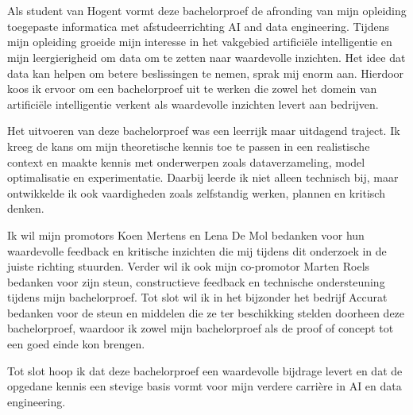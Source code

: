 
\chapter*{}%
\label{ch:voorwoord}


Als student van Hogent vormt deze bachelorproef de afronding van mijn opleiding toegepaste informatica met afstudeerrichting AI and data engineering. Tijdens mijn opleiding groeide mijn interesse in het vakgebied artificiële intelligentie en mijn leergierigheid om data om te zetten naar waardevolle inzichten. Het idee dat data kan helpen om betere beslissingen te nemen, sprak mij enorm aan. Hierdoor koos ik ervoor om een bachelorproef uit te werken die zowel het domein van artificiële intelligentie verkent als waardevolle inzichten levert aan bedrijven.

Het uitvoeren van deze bachelorproef was een leerrijk maar uitdagend traject. Ik kreeg de kans om mijn theoretische kennis toe te passen in een realistische context en maakte kennis met onderwerpen zoals dataverzameling, model optimalisatie en experimentatie. Daarbij leerde ik niet alleen technisch bij, maar ontwikkelde ik ook vaardigheden zoals zelfstandig werken, plannen en kritisch denken.

Ik wil mijn promotors Koen Mertens en Lena De Mol bedanken voor hun waardevolle feedback en kritische inzichten die mij tijdens dit onderzoek in de juiste richting stuurden. Verder wil ik ook mijn co-promotor Marten Roels bedanken voor zijn steun, constructieve feedback en technische ondersteuning tijdens mijn bachelorproef. Tot slot wil ik in het bijzonder het bedrijf Accurat bedanken voor de steun en middelen die ze ter beschikking stelden doorheen deze bachelorproef, waardoor ik zowel mijn bachelorproef als de proof of concept tot een goed einde kon brengen.

Tot slot hoop ik dat deze bachelorproef een waardevolle bijdrage levert en dat de opgedane kennis een stevige basis vormt voor mijn verdere carrière in AI en data engineering.